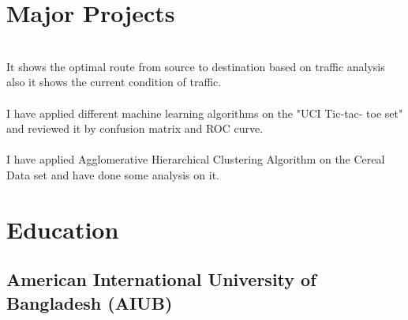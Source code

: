 \documentclass[]{deedy-resume-openfont}
\begin{document}
\begin{minipage}[t]{0.66\textwidth}
%	
%
%
%

\section{Major Projects}
\\
It shows the optimal route from source to destination based on traffic analysis also it shows the current condition of traffic.\\
\sectionsep
{}\\
I have applied different machine learning algorithms on the "UCI Tic-tac- toe set" and reviewed it by confusion matrix and ROC curve.\\
\sectionsep
{}\\
I have applied Agglomerative Hierarchical Clustering Algorithm on the Cereal Data set and have done some analysis on it.\\
\sectionsep

\section{Education}
\subsection{American International University of Bangladesh (AIUB)}
\sectionsep	



\end{minipage}
\end{document}
